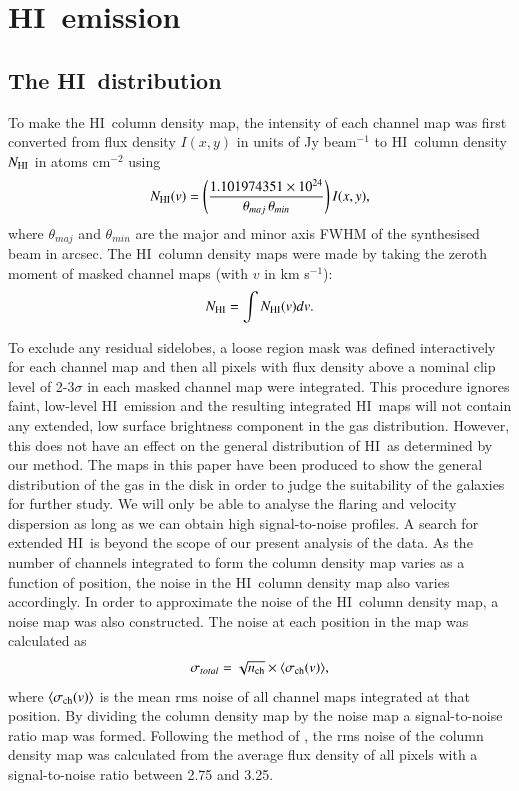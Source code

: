 \documentclass[traditabstract]{aa} %
\newcommand\HI{H{\small I}}
\newcommand\kms{km s$^{-1}$}
\begin{document}
\section{\HI\ emission}
\label{sec:emission-HI}


\subsection{The \HI\ distribution}
\label{sec:dist-HI}

To make the \HI\ column density map, the intensity of each channel map
was first converted from flux density $I(x,y)$ in units of Jy beam$^{-1}$ to
\HI\ column density $N_{\rm HI}$ in atoms cm$^{-2}$ using
\begin{equation}
N_{\rm HI}(v) = \left(
  \frac{1.101974351\times 10^{24}}{\theta_{maj}\,\theta_{min}} \right) I(x,y),
\end{equation}
where $\theta_{maj}$ and $\theta_{min}$ are the major and minor axis
FWHM of the synthesised beam in arcsec.  
The \HI\ column density maps were made by taking the zeroth moment of masked 
channel maps (with $v$ in \kms):
\begin{equation}
N_{\rm HI} = \int N_{\rm HI}(v) dv.
\end{equation}

To exclude any residual sidelobes, a loose region mask was defined
interactively for each channel map and then all pixels with flux
density above a nominal clip level of 2-3$\sigma$ in each masked
channel map were integrated.  This procedure ignores faint, low-level 
\HI\ emission and the resulting integrated \HI\ maps will not contain
any extended, low surface brightness component in the gas distribution. However,
this does not have an effect on the general distribution of \HI\ as determined
by our method. The maps in this paper 
have been produced to show the general distribution of the gas 
in the disk in order to judge the suitability of the galaxies for further study. 
We will only be able to analyse the flaring and
velocity dispersion as
long as we can obtain high signal-to-noise profiles. A search 
for extended \HI\ is beyond the scope of our present analysis of the data. 
As the number of channels integrated to
form the column density map varies as a function of position, the
noise in the \HI\ column density map also varies accordingly. In
order to approximate the noise of the \HI\ column density map, a noise
map was also constructed.  The noise at each position in the map was
calculated as
\begin{equation}
\sigma_{total} = \sqrt{n_{\rm ch}} \times \langle \sigma_{\rm ch}(v) \rangle,
\end{equation}
where $\langle \sigma_{\rm ch}(v) \rangle$ is the mean rms noise of all
channel maps integrated at that position. By dividing the column
density map by the noise map a signal-to-noise ratio map was
formed. Following the method of \citet{kvdkdb2004}, the rms noise of
the column density map was calculated from the average flux density of
all pixels with a signal-to-noise ratio between 2.75 and 3.25.
\end{document}
